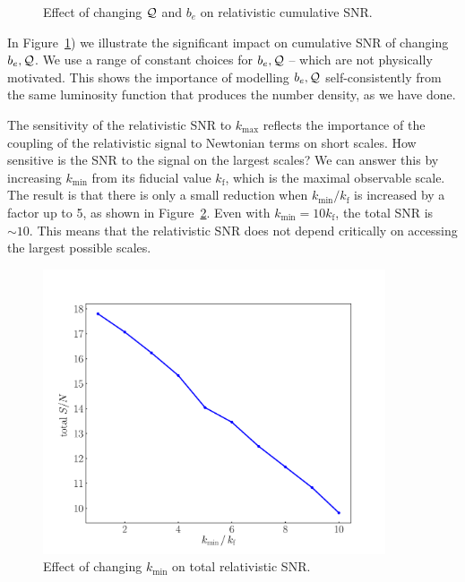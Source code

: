 \begin{itemize}
\begin{figure}[!ht]
\caption{Effect of changing ${\cal Q}$ and $b_e$ on relativistic cumulative SNR.} \label{fig1x}
\end{figure}
In Figure~\ref{fig1x}) we illustrate the significant impact on cumulative SNR of changing $b_e,\mathcal{Q}$. We use a range of constant choices for $b_e,\mathcal{Q}$ -- which are not physically motivated. This shows the importance of modelling $b_e,\mathcal{Q}$ self-consistently from the same  luminosity function that produces the number density, as we have done. 
\end{itemize}

{The sensitivity of the relativistic SNR to  $k_{\mathrm{max}}$ reflects the importance of the coupling of the relativistic signal to Newtonian terms on short scales. How sensitive is the SNR to the signal on the largest scales? We can answer this by increasing $k_{\mathrm{min}}$ from its fiducial value $k_{\mathrm{f}}$, which is the maximal observable scale. The result is that there is only a small reduction when $k_{\mathrm{min}}/k_{\mathrm{f}}$ is increased by a factor up to 5, as shown in Figure~\ref{kmin}. 
{Even with $k_{\mathrm{min}}=10 k_{\mathrm{f}}$, the total SNR is $\sim 10$.} 
This means that the relativistic SNR does not depend critically on accessing the largest possible scales.}
\begin{figure}[!ht]
\centering
\includegraphics[width=0.9\textwidth]{fig/cumDoppSnr_kmin-eps-converted-to}
\caption{{Effect of changing $k_{\mathrm{min}}$ on  total relativistic SNR.} 
} \label{kmin}
\end{figure} 

